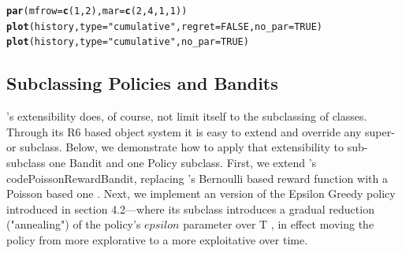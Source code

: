 \documentclass{jss}\usepackage[]{graphicx}\usepackage[]{color}
\makeatletter
\newcommand{\hlnum}[1]{\textcolor[rgb]{0.686,0.059,0.569}{#1}}%
\newcommand{\hlstr}[1]{\textcolor[rgb]{0.192,0.494,0.8}{#1}}%
\newcommand{\hlstd}[1]{\textcolor[rgb]{0.345,0.345,0.345}{#1}}%
\newcommand{\hlkwc}[1]{\textcolor[rgb]{0.333,0.667,0.333}{#1}}%
\newcommand{\hlkwd}[1]{\textcolor[rgb]{0.737,0.353,0.396}{\textbf{#1}}}%
\newenvironment{kframe}{%
 \def\at@end@of@kframe{}%
 \ifinner\ifhmode%
  \def\at@end@of@kframe{\end{minipage}}%
  \begin{minipage}{\columnwidth}%
 \fi\fi%
 \def\FrameCommand##1{\hskip\@totalleftmargin \hskip-\fboxsep
 \colorbox{shadecolor}{##1}\hskip-\fboxsep
     \hskip-\linewidth \hskip-\@totalleftmargin \hskip\columnwidth}%
 \MakeFramed {\advance\hsize-\width
   \@totalleftmargin\z@ \linewidth\hsize
   \@setminipage}}%
 {\par\unskip\endMakeFramed%
 \at@end@of@kframe}
\newenvironment{knitrout}{}{} %
\makeatother
\begin{document}
\begin{knitrout}
\begin{kframe}
\begin{alltt}
\hlkwd{par}\hlstd{(}\hlkwc{mfrow} \hlstd{=} \hlkwd{c}\hlstd{(}\hlnum{1}\hlstd{,} \hlnum{2}\hlstd{),} \hlkwc{mar} \hlstd{=} \hlkwd{c}\hlstd{(}\hlnum{2}\hlstd{,}\hlnum{4}\hlstd{,}\hlnum{1}\hlstd{,}\hlnum{1}\hlstd{))}
\hlkwd{plot}\hlstd{(history,} \hlkwc{type} \hlstd{=} \hlstr{"cumulative"}\hlstd{,} \hlkwc{regret} \hlstd{=} \hlnum{FALSE}\hlstd{,} \hlkwc{no_par} \hlstd{=} \hlnum{TRUE}\hlstd{)}
\hlkwd{plot}\hlstd{(history,} \hlkwc{type} \hlstd{=} \hlstr{"cumulative"}\hlstd{,} \hlkwc{no_par} \hlstd{=} \hlnum{TRUE}\hlstd{)}
\end{alltt}
\end{kframe}
\end{knitrout}
\begin{center}

\end{center}

\subsection{Subclassing Policies and Bandits}

's extensibility does, of course, not limit itself to the subclassing of  classes. Through its R6 based object system it is easy to extend and override any  super- or subclass. Below, we demonstrate how to apply that extensibility to sub-subclass one Bandit and one Policy subclass.
First, we extend 's code{PoissonRewardBandit}, replacing 's Bernoulli based reward function with a Poisson based one \citep{Presman1991}. Next, we implement an  version of the Epsilon Greedy policy introduced in section 4.2---where its  subclass introduces a gradual reduction ("annealing") of the policy's $epsilon$ parameter over T \citep{Cesa-Bianchi1998,Kirkpatrick1983}, in effect moving the policy from more explorative to a more exploitative over time.
\end{document}
